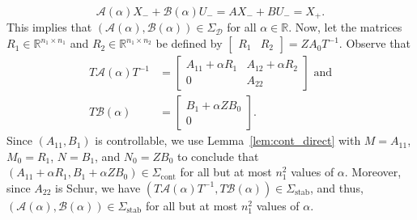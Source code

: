 \documentclass[9pt,shortpaper,twoside,web]{ieeecolor}
\begin{document}
\begin{equation}
\mathcal{A}(\alpha) X_-+\mathcal{B}(\alpha)U_-=AX_-+BU_-=X_+.
\end{equation}
This implies that $(\mathcal{A}(\alpha),\mathcal{B}(\alpha))\in\Sigma_\mathcal{D}$ for all $\alpha\in\mathbb{R}$. Now, let the matrices $R_1\in\mathbb{R}^{n_1\times n_1}$ and $R_2\in\mathbb{R}^{n_1\times n_2}$ be defined by $\begin{bmatrix}
R_1 & R_2
\end{bmatrix}=ZA_0T^{-1}$. Observe that
    \begin{equation}
    \begin{split}
    T\mathcal{A}(\alpha)T^{-1}&=\begin{bmatrix}
    A_{11}+\alpha R_1 & A_{12}+\alpha R_2 \\
    0            & A_{22}
    \end{bmatrix}\text{ and} \\ T\mathcal{B}(\alpha)&=\begin{bmatrix}
    B_1+\alpha Z B_0 \\
    0
    \end{bmatrix}.
    \end{split}
    \end{equation}
Since $(A_{11},B_1)$ is controllable, we use Lemma~\ref{lem:cont_direct} with $M=A_{11}$, \linebreak $M_0=R_1$, $N=B_1$, and $N_0=Z B_0$ to conclude that \mbox{$(A_{11}+\alpha R_1,B_1+\alpha Z B_0)\in\Sigma_\text{cont}$}
for all but at most $n_1^2$ values of $\alpha$. Moreover, since $A_{22}$ is Schur, we have \mbox{$(T\mathcal{A}(\alpha)T^{-1},T\mathcal{B}(\alpha))\in\Sigma_\text{stab}$},
and thus, $(\mathcal{A}(\alpha),\mathcal{B}(\alpha))\in\Sigma_\text{stab}$ for all but at most $n_1^2$ values of $\alpha$. 
\end{document}
